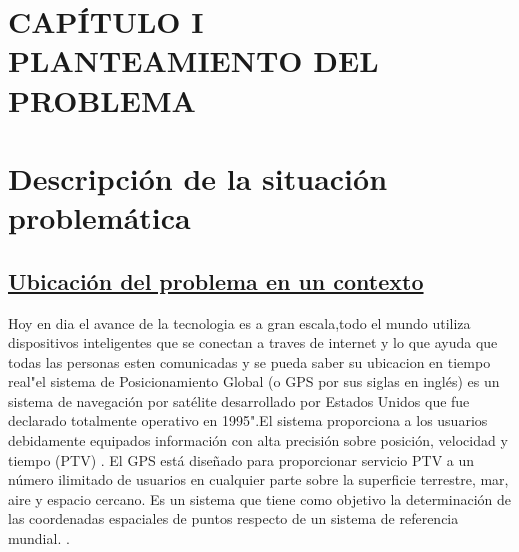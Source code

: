 \documentclass[12pt, a4paper, nofontenc, numbers=endperiod]{apa7}
\begin{document}
{
	\setlength\headsep{2.95cm}
	\addtolength{\textheight}{-2.45cm}
	\section*{\large \centering CAPÍTULO I \\ PLANTEAMIENTO DEL PROBLEMA}
	{\doublespacing
		\section{\normalsize \centering Descripción de la situación problemática} 
		\subsection*{\normalsize \underline{Ubicación del problema en un contexto}}
		\setlength{\parindent}{1.27cm}Hoy en dia el avance de la tecnologia es a gran escala,todo el mundo utiliza dispositivos inteligentes que se conectan a traves de internet y lo que ayuda que todas las personas esten comunicadas y se pueda saber su ubicacion en tiempo real"el sistema de Posicionamiento Global (o GPS por sus siglas en inglés) es un sistema de navegación por satélite desarrollado por Estados Unidos que fue declarado totalmente operativo en 1995"\cite{crovo2015analisis}.El sistema proporciona a los usuarios debidamente equipados información con alta precisión sobre posición, velocidad y tiempo (PTV) . El GPS está diseñado para proporcionar servicio PTV a un número ilimitado de usuarios en cualquier parte sobre la superficie terrestre, mar, aire y espacio cercano.\cite{capdevila2018sistema}
		Es un sistema que tiene como objetivo la determinación de las
		coordenadas espaciales de puntos respecto de un sistema de referencia mundial. \cite{campoverde2020analisis}
		\setlength{\parindent}{1.27cm}.
		
}}
\end{document}

